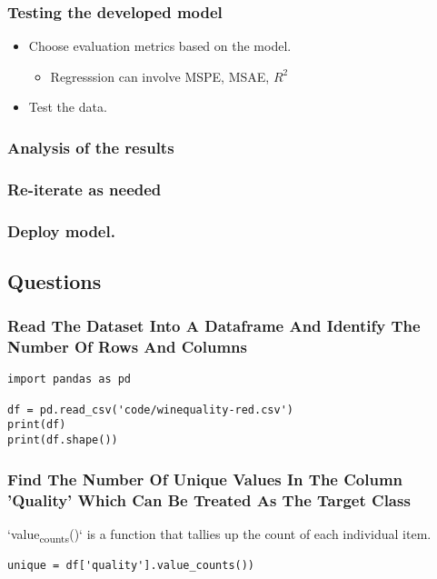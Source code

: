 \documentclass[11pt]{article}
\begin{document}
\subsubsection{Testing the developed model}
\label{sec:org91e8c20}
\begin{itemize}
\item Choose evaluation metrics based on the model.
\begin{itemize}
\item Regresssion can involve MSPE, MSAE, \(R^2\)
\end{itemize}
\item Test the data.
\end{itemize}
\subsubsection{Analysis of the results}
\label{sec:org17fff8e}
\subsubsection{Re-iterate as needed}
\label{sec:org4fb3303}
\subsubsection{Deploy model.}
\label{sec:org0d841a2}
\subsection{Questions}
\label{sec:orgb27d6aa}
\subsubsection{Read The Dataset Into A Dataframe And Identify The Number Of Rows And Columns}
\label{sec:org8eba5cd}
\begin{verbatim}
import pandas as pd

df = pd.read_csv('code/winequality-red.csv')
print(df)
print(df.shape())
\end{verbatim}
\subsubsection{Find The Number Of Unique Values In The Column 'Quality' Which Can Be Treated As The Target Class}
\label{sec:orgdb68ba7}
`value\textsubscript{counts}()` is a function that tallies up the count of each individual item.
\begin{verbatim}
unique = df['quality'].value_counts())
\end{verbatim}
\end{document}
